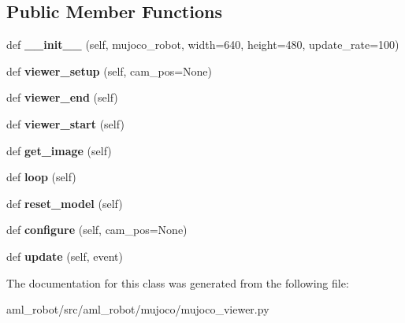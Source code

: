 \subsection*{Public Member Functions}
\begin{DoxyCompactItemize}
\item 
\hypertarget{classaml__robot_1_1mujoco_1_1mujoco__viewer_1_1_mujoco_viewer_acb1d3d136b12aa50419d70f32b52edd2}{}\label{classaml__robot_1_1mujoco_1_1mujoco__viewer_1_1_mujoco_viewer_acb1d3d136b12aa50419d70f32b52edd2} 
def {\bfseries \+\_\+\+\_\+init\+\_\+\+\_\+} (self, mujoco\+\_\+robot, width=640, height=480, update\+\_\+rate=100)
\item 
\hypertarget{classaml__robot_1_1mujoco_1_1mujoco__viewer_1_1_mujoco_viewer_add7e7d8476d1d5b4c3b2fb46c8508c7b}{}\label{classaml__robot_1_1mujoco_1_1mujoco__viewer_1_1_mujoco_viewer_add7e7d8476d1d5b4c3b2fb46c8508c7b} 
def {\bfseries viewer\+\_\+setup} (self, cam\+\_\+pos=None)
\item 
\hypertarget{classaml__robot_1_1mujoco_1_1mujoco__viewer_1_1_mujoco_viewer_ad19733ffbcfa3b0760655b1e2b1727c9}{}\label{classaml__robot_1_1mujoco_1_1mujoco__viewer_1_1_mujoco_viewer_ad19733ffbcfa3b0760655b1e2b1727c9} 
def {\bfseries viewer\+\_\+end} (self)
\item 
\hypertarget{classaml__robot_1_1mujoco_1_1mujoco__viewer_1_1_mujoco_viewer_a7973520f13f58e7e1056050dcef13a13}{}\label{classaml__robot_1_1mujoco_1_1mujoco__viewer_1_1_mujoco_viewer_a7973520f13f58e7e1056050dcef13a13} 
def {\bfseries viewer\+\_\+start} (self)
\item 
\hypertarget{classaml__robot_1_1mujoco_1_1mujoco__viewer_1_1_mujoco_viewer_aa160d2cc437f587d05662033b857fab7}{}\label{classaml__robot_1_1mujoco_1_1mujoco__viewer_1_1_mujoco_viewer_aa160d2cc437f587d05662033b857fab7} 
def {\bfseries get\+\_\+image} (self)
\item 
\hypertarget{classaml__robot_1_1mujoco_1_1mujoco__viewer_1_1_mujoco_viewer_ad8b64993ac0eeda06da7e68fd58e993b}{}\label{classaml__robot_1_1mujoco_1_1mujoco__viewer_1_1_mujoco_viewer_ad8b64993ac0eeda06da7e68fd58e993b} 
def {\bfseries loop} (self)
\item 
\hypertarget{classaml__robot_1_1mujoco_1_1mujoco__viewer_1_1_mujoco_viewer_acbb6ddf0dde0b62b9a702d3fa71d643b}{}\label{classaml__robot_1_1mujoco_1_1mujoco__viewer_1_1_mujoco_viewer_acbb6ddf0dde0b62b9a702d3fa71d643b} 
def {\bfseries reset\+\_\+model} (self)
\item 
\hypertarget{classaml__robot_1_1mujoco_1_1mujoco__viewer_1_1_mujoco_viewer_aee9cdd2715eabf8d2c8d6f8b9f59d2fe}{}\label{classaml__robot_1_1mujoco_1_1mujoco__viewer_1_1_mujoco_viewer_aee9cdd2715eabf8d2c8d6f8b9f59d2fe} 
def {\bfseries configure} (self, cam\+\_\+pos=None)
\item 
\hypertarget{classaml__robot_1_1mujoco_1_1mujoco__viewer_1_1_mujoco_viewer_a60de01cc08fbf120359e8e6070f9eb8e}{}\label{classaml__robot_1_1mujoco_1_1mujoco__viewer_1_1_mujoco_viewer_a60de01cc08fbf120359e8e6070f9eb8e} 
def {\bfseries update} (self, event)
\end{DoxyCompactItemize}


The documentation for this class was generated from the following file\+:\begin{DoxyCompactItemize}
\item 
aml\+\_\+robot/src/aml\+\_\+robot/mujoco/mujoco\+\_\+viewer.\+py\end{DoxyCompactItemize}
